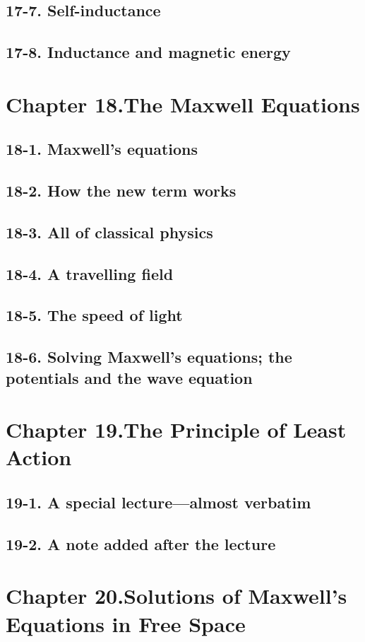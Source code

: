 \documentclass{article}
\begin{document}
\subsection{17-7. Self-inductance}
\subsection{17-8. Inductance and magnetic energy}
\section{Chapter 18.The Maxwell Equations}
\subsection{18-1. Maxwell’s equations}
\subsection{18-2. How the new term works}
\subsection{18-3. All of classical physics}
\subsection{18-4. A travelling field}
\subsection{18-5. The speed of light}
\subsection{18-6. Solving Maxwell’s equations; the potentials and the wave equation}
\section{Chapter 19.The Principle of Least Action}
\subsection{19-1. A special lecture—almost verbatim}
\subsection{19-2. A note added after the lecture}
\section{Chapter 20.Solutions of Maxwell’s Equations in Free Space}
\end{document}
